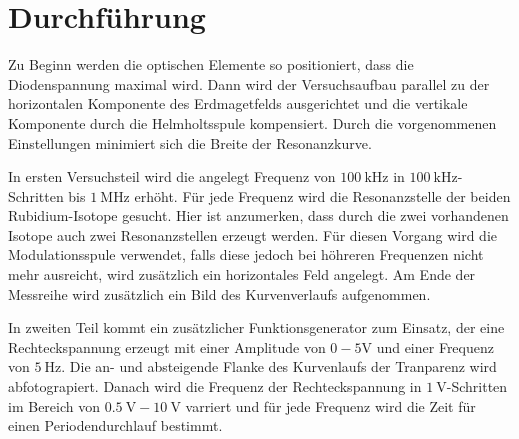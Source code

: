 \section{Durchführung}
\label{sec:Durchführung}

Zu Beginn werden die optischen Elemente so positioniert, dass die Diodenspannung maximal wird.
Dann wird der Versuchsaufbau parallel zu der horizontalen Komponente des Erdmagetfelds ausgerichtet und die vertikale Komponente durch die Helmholtsspule kompensiert.
Durch die vorgenommenen Einstellungen minimiert sich die Breite der Resonanzkurve.

In ersten Versuchsteil wird die angelegt Frequenz von $\SI{100}{\kilo\hertz}$ in $\SI{100}{\kilo\hertz}$-Schritten bis $\SI{1}{\mega\hertz}$ erhöht.
Für jede Frequenz wird die Resonanzstelle der beiden Rubidium-Isotope gesucht.
Hier ist anzumerken, dass durch die zwei vorhandenen Isotope auch zwei Resonanzstellen erzeugt werden.
Für diesen Vorgang wird die Modulationsspule verwendet, falls diese jedoch bei höhreren Frequenzen nicht mehr ausreicht, wird zusätzlich ein horizontales Feld angelegt.
Am Ende der Messreihe wird zusätzlich ein Bild des Kurvenverlaufs aufgenommen.

In zweiten Teil kommt ein zusätzlicher Funktionsgenerator zum Einsatz, der eine Rechteckspannung erzeugt mit einer Amplitude von $0-5\si{\volt}$ und einer Frequenz von $\SI{5}{\hertz}$.
Die an- und absteigende Flanke des Kurvenlaufs der Tranparenz wird abfotograpiert.
Danach wird die Frequenz der Rechteckspannung in $\SI{1}{\volt}$-Schritten im Bereich von $\SI{0,5}{\volt}-\SI{10}{\volt}$ varriert und für jede Frequenz wird die Zeit für einen Periodendurchlauf bestimmt.
